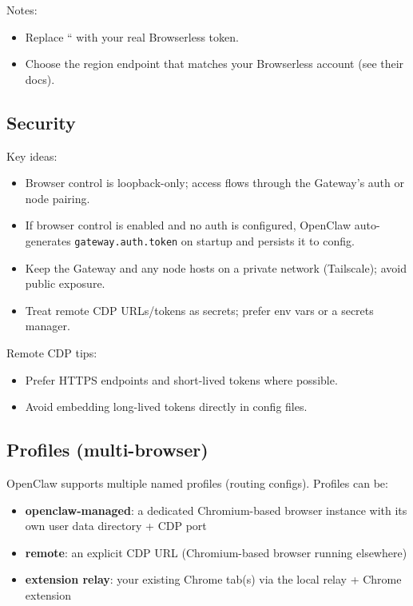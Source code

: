 Notes:

\begin{itemize}
  \item Replace `` with your real Browserless token.
  \item Choose the region endpoint that matches your Browserless account (see their docs).
\end{itemize}


\subsection{Security}


Key ideas:

\begin{itemize}
  \item Browser control is loopback-only; access flows through the Gateway’s auth or node pairing.
  \item If browser control is enabled and no auth is configured, OpenClaw auto-generates \texttt{gateway.auth.token} on startup and persists it to config.
  \item Keep the Gateway and any node hosts on a private network (Tailscale); avoid public exposure.
  \item Treat remote CDP URLs/tokens as secrets; prefer env vars or a secrets manager.
\end{itemize}


Remote CDP tips:

\begin{itemize}
  \item Prefer HTTPS endpoints and short-lived tokens where possible.
  \item Avoid embedding long-lived tokens directly in config files.
\end{itemize}


\subsection{Profiles (multi-browser)}


OpenClaw supports multiple named profiles (routing configs). Profiles can be:

\begin{itemize}
  \item \textbf{openclaw-managed}: a dedicated Chromium-based browser instance with its own user data directory + CDP port
  \item \textbf{remote}: an explicit CDP URL (Chromium-based browser running elsewhere)
  \item \textbf{extension relay}: your existing Chrome tab(s) via the local relay + Chrome extension
\end{itemize}


